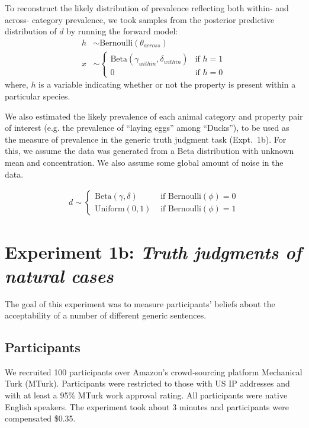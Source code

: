 \documentclass[10pt,letterpaper]{article}
\begin{document}
To reconstruct the likely distribution of  prevalence reflecting both within- and across- category prevalence, we took samples from the posterior predictive distribution of $d$ by running the forward model: 
%
\begin{align*}
h & \sim \text{Bernoulli}(\theta_{across}) \\
x & \sim \begin{cases} 
		\text{Beta}(\gamma_{within}, \delta_{within}) &\mbox{if } h = 1 \\ 
				0 & \mbox{if } h=0
				\end{cases} 
\end{align*}
%
where, $h$ is a variable indicating whether or not the property is present within a particular species. 

We also estimated the likely prevalence of each animal category and property pair of interest (e.g. the prevalence of ``laying eggs'' among ``Ducks''), to be used as the measure of prevalence in the generic truth judgment task (Expt.~1b). 
For this, we assume the data was generated from a Beta distribution with unknown mean and concentration. 
We also assume some global amount of noise in the data.

\begin{align*}
d \sim \begin{cases}
					\text{Beta}(\gamma, \delta)  &  \mbox{ if } \text{Bernoulli} (\phi) = 0 \\
					\text{Uniform}(0,1) & \mbox{ if } \text{Bernoulli} (\phi) = 1
				\end{cases}
\end{align*}




\section{Experiment 1b: \emph{Truth judgments of natural cases}}

The goal of this experiment was to measure participants' beliefs about the acceptability of a number of different generic sentences. 

\subsection{Participants}

We recruited 100 participants over Amazon's crowd-sourcing platform Mechanical Turk (MTurk).  Participants were restricted to those with US IP addresses and with at least a 95\% MTurk work approval rating. All participants were native English speakers. The experiment took about 3 minutes and participants were compensated \$0.35.
\end{document}
